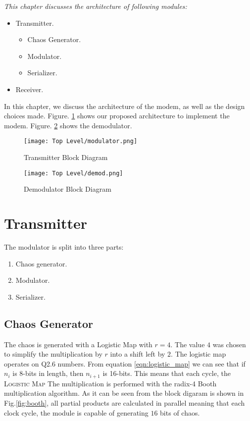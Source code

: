 \vfill
\textit{This chapter discusses the architecture of following modules:}
\begin{itemize}
    \item Transmitter.
    \begin{itemize}
        \item Chaos Generator.
        \item Modulator.
        \item Serializer.
    \end{itemize}
    \item Receiver.

\end{itemize}
\vfill


\newpage
In this chapter, we discuss the architecture of the modem, as well as the design choices made. Figure. \ref{fig:full_mod} shows our proposed architecture to implement the modem. Figure. \ref{fig:dmod} shows the demodulator.


\begin{figure}[p]
    \label{fig:full_mod}
    \caption{Transmitter Block Diagram}
    \texttt{[image: Top Level/modulator.png]}
\end{figure}

\begin{figure}[p]
    \label{fig:dmod}
    \caption{Demodulator Block Diagram}
    \texttt{[image: Top Level/demod.png]}
\end{figure}

\section{Transmitter}
The modulator is split into three parts:
\begin{enumerate}
    \item Chaos generator.
    \item Modulator.
    \item Serializer.
\end{enumerate}

\subsection{Chaos Generator}
The chaos is generated with a Logistic Map with $r = 4$. The value $4$ was chosen to simplify the multiplication by $r$ into a shift left by
$2$. The logistic map operates on Q2.6 numbers. From equation \ref{eqn:logistic_map} we can see that if $n_{i}$ is 8-bits in length,
then $n_{i+1}$ is 16-bits. This means that each cycle, the \textsc{Logistic Map} The multiplication is performed with the radix-4 Booth multiplication algorithm. As it
can be seen from the block digaram is shown in Fig.\ref{fig:booth}, all partial products are calculated in parallel meaning that each clock cycle, the module is capable
of generating $16$ bits of chaos.

